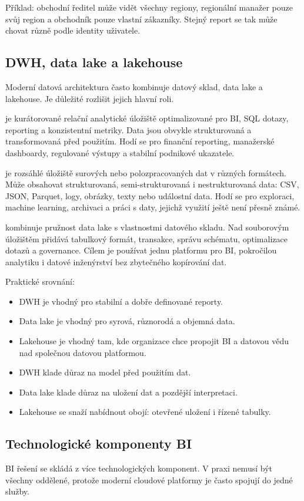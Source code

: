 Příklad: obchodní ředitel může vidět všechny regiony, regionální manažer pouze svůj region a obchodník pouze vlastní zákazníky. Stejný report se tak může chovat různě podle identity uživatele.

\subsection{DWH, data lake a lakehouse}
Moderní datová architektura často kombinuje datový sklad, data lake a lakehouse. Je důležité rozlišit jejich hlavní roli.

 je kurátorované relační analytické úložiště optimalizované pro BI, SQL dotazy, reporting a konzistentní metriky. Data jsou obvykle strukturovaná a transformovaná před použitím. Hodí se pro finanční reporting, manažerské dashboardy, regulované výstupy a stabilní podnikové ukazatele.

 je rozsáhlé úložiště surových nebo polozpracovaných dat v různých formátech. Může obsahovat strukturovaná, semi-strukturovaná i nestrukturovaná data: CSV, JSON, Parquet, logy, obrázky, texty nebo událostní data. Hodí se pro exploraci, machine learning, archivaci a práci s daty, jejichž využití ještě není přesně známé.

 kombinuje pružnost data lake s vlastnostmi datového skladu. Nad souborovým úložištěm přidává tabulkový formát, transakce, správu schématu, optimalizace dotazů a governance. Cílem je používat jednu platformu pro BI, pokročilou analytiku i datové inženýrství bez zbytečného kopírování dat.

Praktické srovnání:
\begin{itemize}
  \item DWH je vhodný pro stabilní a dobře definované reporty.
  \item Data lake je vhodný pro syrová, různorodá a objemná data.
  \item Lakehouse je vhodný tam, kde organizace chce propojit BI a datovou vědu nad společnou datovou platformou.
  \item DWH klade důraz na model před použitím dat.
  \item Data lake klade důraz na uložení dat a pozdější interpretaci.
  \item Lakehouse se snaží nabídnout obojí: otevřené uložení i řízené tabulky.
\end{itemize}

\subsection{Technologické komponenty BI}
BI řešení se skládá z více technologických komponent. V praxi nemusí být všechny oddělené, protože moderní cloudové platformy je často spojují do jedné služby.

